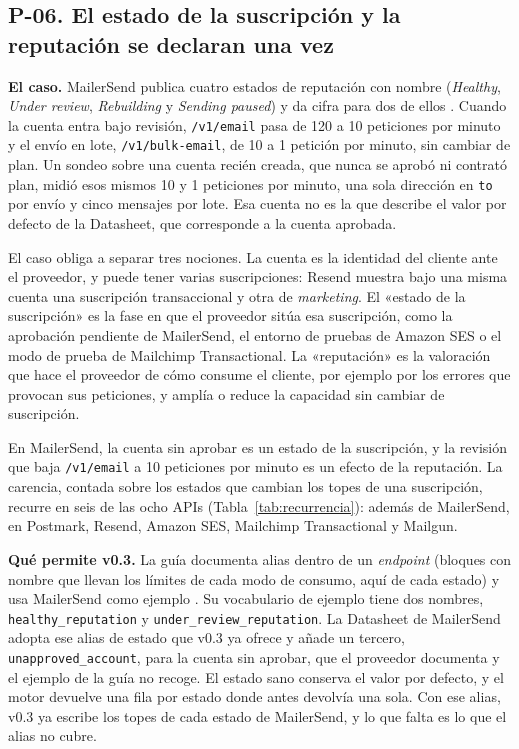 \subsection{P-06. El estado de la suscripción y la reputación se declaran una vez}
\label{subsec:evolucion:p06}

\textbf{El caso.} MailerSend publica cuatro estados de reputación con nombre (\textit{Healthy}, \textit{Under review}, \textit{Rebuilding} y \textit{Sending paused}) y da cifra para dos de ellos \citep{mailersenddocs}.
Cuando la cuenta entra bajo revisión, \texttt{/v1/email} pasa de 120 a 10 peticiones por minuto y el envío en lote, \texttt{/v1/bulk-email}, de 10 a 1 petición por minuto, sin cambiar de plan.
Un sondeo sobre una cuenta recién creada, que nunca se aprobó ni contrató plan, midió esos mismos 10 y 1 peticiones por minuto, una sola dirección en \texttt{to} por envío y cinco mensajes por lote.
Esa cuenta no es la que describe el valor por defecto de la Datasheet, que corresponde a la cuenta aprobada.

El caso obliga a separar tres nociones.
La cuenta es la identidad del cliente ante el proveedor, y puede tener varias suscripciones: Resend muestra bajo una misma cuenta una suscripción transaccional y otra de \textit{marketing}.
El «estado de la suscripción» es la fase en que el proveedor sitúa esa suscripción, como la aprobación pendiente de MailerSend, el entorno de pruebas de Amazon SES o el modo de prueba de Mailchimp Transactional.
La «reputación» es la valoración que hace el proveedor de cómo consume el cliente, por ejemplo por los errores que provocan sus peticiones, y amplía o reduce la capacidad sin cambiar de suscripción.

En MailerSend, la cuenta sin aprobar es un estado de la suscripción, y la revisión que baja \texttt{/v1/email} a 10 peticiones por minuto es un efecto de la reputación.
La carencia, contada sobre los estados que cambian los topes de una suscripción, recurre en seis de las ocho APIs (Tabla~\ref{tab:recurrencia}): además de MailerSend, en Postmark, Resend, Amazon SES, Mailchimp Transactional y Mailgun.

\textbf{Qué permite v0.3.} La guía documenta alias dentro de un \textit{endpoint} (bloques con nombre que llevan los límites de cada modo de consumo, aquí de cada estado) y usa MailerSend como ejemplo \citep{apisconsumptionmodel}.
Su vocabulario de ejemplo tiene dos nombres, \texttt{healthy\_reputation} y \texttt{under\_review\_reputation}.
La Datasheet de MailerSend adopta ese alias de estado que v0.3 ya ofrece y añade un tercero, \texttt{unapproved\_account}, para la cuenta sin aprobar, que el proveedor documenta y el ejemplo de la guía no recoge.
El estado sano conserva el valor por defecto, y el motor devuelve una fila por estado donde antes devolvía una sola.
Con ese alias, v0.3 ya escribe los topes de cada estado de MailerSend, y lo que falta es lo que el alias no cubre.

